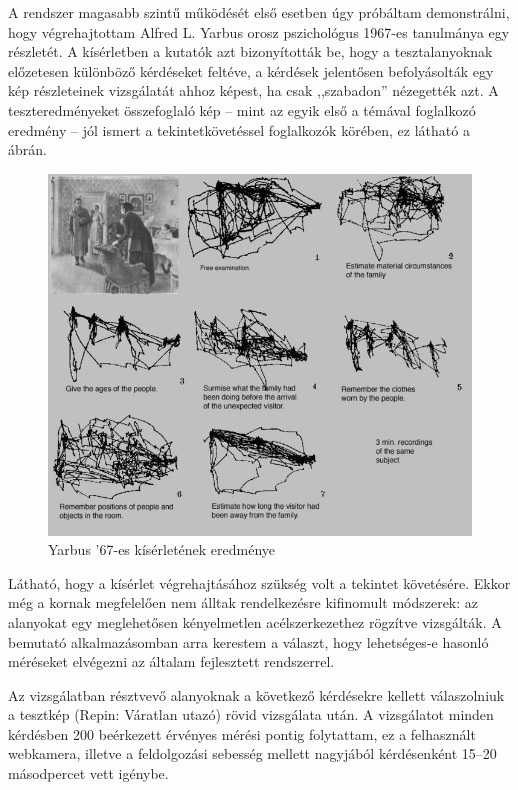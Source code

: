 A rendszer magasabb szintű működését első esetben úgy próbáltam demonstrálni, hogy végrehajtottam Alfred L. Yarbus orosz pszichológus 1967-es tanulmánya egy részletét. A kísérletben a kutatók azt bizonyították be, hogy a tesztalanyoknak előzetesen különböző kérdéseket feltéve, a kérdések jelentősen befolyásolták egy kép részleteinek vizsgálatát ahhoz képest, ha csak ,,szabadon'' nézegették azt. A teszteredményeket összefoglaló kép -- mint az egyik első a témával foglalkozó eredmény -- jól ismert a tekintetkövetéssel foglalkozók körében, ez látható a  ábrán.

\begin{figure}[!ht]
\centering
\includegraphics[width=140mm, keepaspectratio]{figures/yarbus.jpg}
\caption{Yarbus '67-es kísérletének eredménye}
\label{fig:yarbus}
\end{figure}

Látható, hogy a kísérlet végrehajtásához szükség volt a tekintet követésére. Ekkor még a kornak megfelelően nem álltak rendelkezésre kifinomult módszerek: az alanyokat egy meglehetősen kényelmetlen acélszerkezethez rögzítve vizsgálták. A bemutató alkalmazásomban arra kerestem a választ, hogy lehetséges-e hasonló méréseket elvégezni az általam fejlesztett rendszerrel.

\bigskip

Az vizsgálatban résztvevő alanyoknak a következő kérdésekre kellett válaszolniuk a tesztkép (Repin: Váratlan utazó) rövid vizsgálata után. A vizsgálatot minden kérdésben 200 beérkezett érvényes mérési pontig folytattam, ez a felhasznált webkamera, illetve a feldolgozási sebesség mellett nagyjából kérdésenként 15--20 másodpercet vett igénybe.

